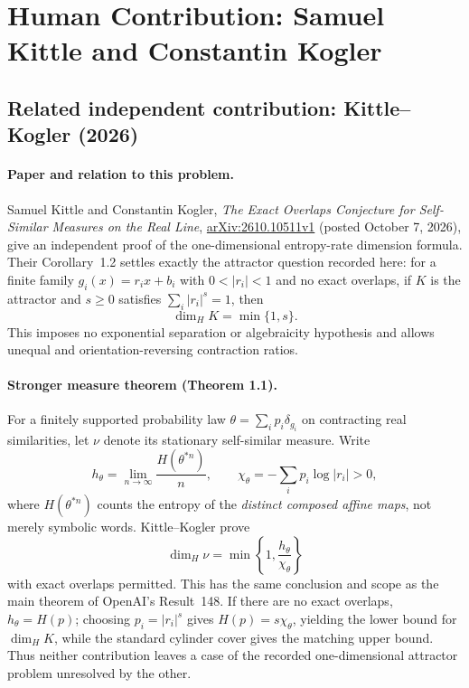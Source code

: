 \documentclass[11pt]{article}
\begin{document}
\section*{Human Contribution: Samuel Kittle and Constantin Kogler}


\subsection*{Related independent contribution: Kittle--Kogler (2026)}

\paragraph{Paper and relation to this problem.}
Samuel Kittle and Constantin Kogler, \emph{The Exact Overlaps
Conjecture for Self-Similar Measures on the Real Line},
\href{https://arxiv.org/abs/2610.10511}{arXiv:2610.10511v1}
(posted October 7, 2026), give an independent proof of the
one-dimensional entropy-rate dimension formula. Their Corollary~1.2
settles exactly the attractor question recorded here: for a finite family
$g_i(x)=r_i x+b_i$ with $0<|r_i|<1$ and no exact overlaps, if $K$ is the
attractor and $s\geq 0$ satisfies $\sum_i|r_i|^s=1$, then
\[
  \boxed{\dim_H K=\min\{1,s\}.}
\]
This imposes no exponential separation or algebraicity hypothesis and
allows unequal and orientation-reversing contraction ratios.

\paragraph{Stronger measure theorem (Theorem 1.1).}
For a finitely supported probability law $\theta=\sum_i p_i\delta_{g_i}$
on contracting real similarities, let $\nu$ denote its stationary
self-similar measure. Write
\[
 h_\theta=\lim_{n\to\infty}\frac{H(\theta^{*n})}{n},
 \qquad
 \chi_\theta=-\sum_i p_i\log|r_i|>0,
\]
where $H(\theta^{*n})$ counts the entropy of the \emph{distinct composed
affine maps}, not merely symbolic words. Kittle--Kogler prove
\[
 \boxed{\dim_H\nu=\min\left\{1,\frac{h_\theta}{\chi_\theta}\right\}}
\]
with exact overlaps permitted. This has the same conclusion and scope
as the main theorem of OpenAI's Result~148. If there are no exact
overlaps, $h_\theta=H(p)$; choosing $p_i=|r_i|^s$ gives
$H(p)=s\chi_\theta$, yielding the lower bound for $\dim_H K$, while
the standard cylinder cover gives the matching upper bound.
Thus neither contribution leaves a case of the recorded one-dimensional
attractor problem unresolved by the other.
\end{document}
